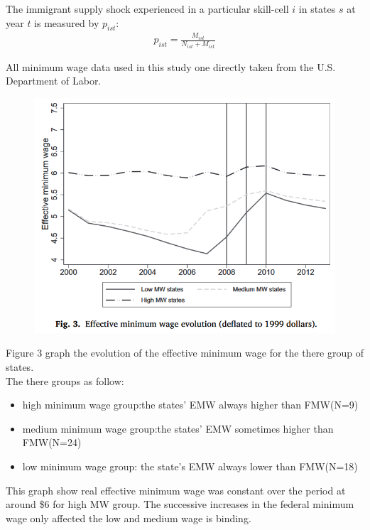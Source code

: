 \documentclass[../root]{subfiles}
\begin{document}
    The immigrant supply shock experienced in a particular  skill-cell $i$ in states $s$ at year $t$ is measured by $p_{ist}$:
    \begin{align}
        p_{ist}=\frac{M_{ist}}{N_{ist}+M_{ist}}
    \end{align}

    All minimum wage data used in this study one directly taken from the U.S. Department of Labor.
    \begin{figure}[h]
        \includegraphics[width=12cm]{0612sugiyama/figure3.png}
    \end{figure}
    Figure 3 graph the evolution of the effective minimum wage for the there group of states. \\
    The there groups as follow:
    \begin{itemize}
        \item high minimum wage group:the states' EMW always higher than FMW(N=9)
        \item medium minimum wage group:the states' EMW sometimes higher than FMW(N=24)
        \item low minimum wage group: the state's EMW always lower than FMW(N=18)
    \end{itemize}

    This graph show real effective minimum wage was constant over the period at around \$6 for high MW group.
    The successive increases in the federal minimum wage only affected the low and medium wage is binding.
\end{document}
